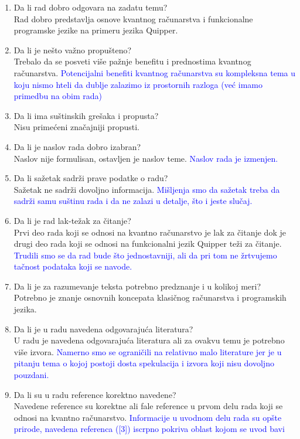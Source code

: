 \documentclass[a4paper]{report}
\newcommand{\odgovor}[1]{\textcolor{blue}{#1}}
\begin{document}
\begin{enumerate}
\item Da li rad dobro odgovara na zadatu temu?\\
Rad dobro predstavlja osnove kvantnog računarstva i funkcionalne programske jezike na primeru jezika Quipper.
\item Da li je nešto važno propušteno?\\
Trebalo da se posveti više pažnje benefitu i prednostima kvantnog računarstva.
\odgovor {Potencijalni benefiti kvantnog računarstva su kompleksna tema u koju nismo hteli da dublje zalazimo iz prostornih razloga (već imamo primedbu na obim rada)}
\item Da li ima suštinskih grešaka i propusta?\\
Nisu primećeni značajniji propusti.
\item Da li je naslov rada dobro izabran?\\
Naslov nije formulisan, ostavljen je naslov teme.
\odgovor { Naslov rada je izmenjen. }
\item Da li sažetak sadrži prave podatke o radu?\\
Sažetak ne sadrži dovoljno informacija.
\odgovor {Mišljenja smo da sažetak treba da sadrži samu suštinu rada i da ne zalazi u detalje, što i jeste slučaj.}
\item Da li je rad lak-težak za čitanje?\\
Prvi deo rada koji se odnosi na kvantno računarstvo je lak za čitanje dok je drugi deo rada koji se odnosi na funkcionalni jezik Quipper teži za čitanje. 
\odgovor {Trudili smo se da rad bude što jednostavniji, ali da pri tom ne žrtvujemo tačnost podataka koji se navode.}
\item Da li je za razumevanje teksta potrebno predznanje i u kolikoj meri?\\
Potrebno je znanje osnovnih koncepata klasičnog računarstva i programskih jezika.
\item Da li je u radu navedena odgovarajuća literatura?\\
U radu je navedena odgovarajuća literatura ali za ovakvu temu je potrebno više izvora.
\odgovor {Namerno smo se ograničili na relativno malo literature jer je u pitanju tema o kojoj postoji dosta spekulacija i izvora koji nisu dovoljno pouzdani.}
\item Da li su u radu reference korektno navedene?\\
Navedene reference su korektne ali fale reference u prvom delu rada koji se odnosi na kvantno računarstvo. 
\odgovor{ Informacije u uvodnom delu rada su opšte prirode, navedena referenca ([3]) iscrpno pokriva oblast kojom se uvod bavi }

\end{enumerate}
\end{document}
